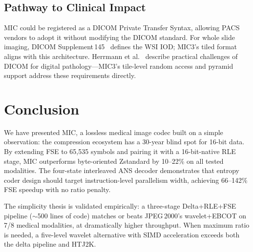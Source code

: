 \documentclass[10pt,twocolumn]{article}
\begin{document}
\subsection{Pathway to Clinical Impact}

MIC could be registered as a DICOM Private Transfer Syntax, allowing PACS vendors to adopt it without modifying the DICOM standard. For whole slide imaging, DICOM Supplement\,145~\cite{dicomsup145} defines the WSI IOD; MIC3's tiled format aligns with this architecture. Herrmann et al.~\cite{herrmann2018} describe practical challenges of DICOM for digital pathology---MIC3's tile-level random access and pyramid support address these requirements directly.

\section{Conclusion}
\label{sec:conclusion}

We have presented MIC, a lossless medical image codec built on a simple observation: the compression ecosystem has a 30-year blind spot for 16-bit data. By extending FSE to 65,535 symbols and pairing it with a 16-bit-native RLE stage, MIC outperforms byte-oriented Zstandard by 10--22\% on all tested modalities. The four-state interleaved ANS decoder demonstrates that entropy coder design should target instruction-level parallelism width, achieving 66--142\% FSE speedup with no ratio penalty.

The simplicity thesis is validated empirically: a three-stage Delta+RLE+FSE pipeline ($\sim$500 lines of code) matches or beats JPEG\,2000's wavelet+EBCOT on 7/8 medical modalities, at dramatically higher throughput. When maximum ratio is needed, a five-level wavelet alternative with SIMD acceleration exceeds both the delta pipeline and HTJ2K.
\end{document}

